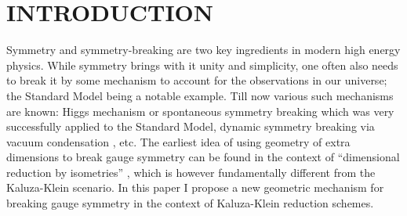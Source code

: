 \documentclass[a4paper,12pt]{article}
\begin{document}
\begin{abstract}
In this paper, I explain how gauge symmetry can be broken in a geometric way, \`{a} la Kaluza-Klein. In higher dimensional gravitational theories, one usually considers the  extra dimensions to be ``frozen'' in time. However, the  internal manifold is actually a dynamic entity. For example, its  metric can change even if one expects its topological properties to be invariant. It is conceivable  then, that at an earlier epoch the internal manifold made a geometric transition from say a maximally symmetric metric space to a less symmetric one. We know in a Kaluza-Klein reduction scheme, the massless gauge bosons are associated with the Killing vectors of the internal manifold.  After the  transition of the internal manifold, the gauge bosons associated with the broken Killing isometries will pick up a mass thereby breaking the gauge invariance partially. In this paper, I explore this idea, work out the mass of broken gauge bosons  for some simple examples, and also point out how a mechanism similar to that of Higgs may be at work.  
\end {abstract}

\newpage
\setcounter{page}{1}

\section{{\bf   INTRODUCTION}}

Symmetry and symmetry-breaking are two key ingredients in modern high energy physics. While symmetry brings with it unity and simplicity, one often also needs  to break it by some mechanism to account for the observations in our universe; the Standard Model being a notable example. Till now various such mechanisms are known: Higgs mechanism \cite{higgs} or spontaneous symmetry breaking which was very successfully applied to the Standard Model, dynamic symmetry breaking via vacuum condensation \cite{coleman}, etc. The earliest idea of using geometry of extra dimensions to break gauge symmetry can be found  in the context of ``dimensional reduction by isometries'' \cite{cho}, which is however fundamentally different from the Kaluza-Klein scenario. In this paper I propose a new geometric mechanism for breaking gauge symmetry in the context of Kaluza-Klein reduction schemes. 
\end{document}
